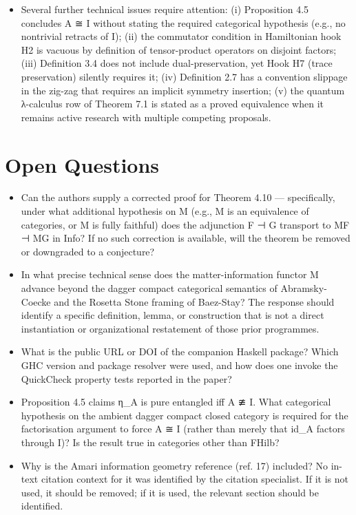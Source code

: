 \documentclass[11pt]{article}
\begin{document}
\begin{itemize}[leftmargin=*]
  \item Several further technical issues require attention: (i) Proposition 4.5 concludes A ≅ I without stating the required categorical hypothesis (e.g., no nontrivial retracts of I); (ii) the commutator condition in Hamiltonian hook H2 is vacuous by definition of tensor-product operators on disjoint factors; (iii) Definition 3.4 does not include dual-preservation, yet Hook H7 (trace preservation) silently requires it; (iv) Definition 2.7 has a convention slippage in the zig-zag that requires an implicit symmetry insertion; (v) the quantum λ-calculus row of Theorem 7.1 is stated as a proved equivalence when it remains active research with multiple competing proposals.
\end{itemize}

\section*{Open Questions}
\begin{itemize}[leftmargin=*]
  \item Can the authors supply a corrected proof for Theorem 4.10 — specifically, under what additional hypothesis on M (e.g., M is an equivalence of categories, or M is fully faithful) does the adjunction F ⊣ G transport to MF ⊣ MG in Info? If no such correction is available, will the theorem be removed or downgraded to a conjecture?
  \item In what precise technical sense does the matter-information functor M advance beyond the dagger compact categorical semantics of Abramsky-Coecke and the Rosetta Stone framing of Baez-Stay? The response should identify a specific definition, lemma, or construction that is not a direct instantiation or organizational restatement of those prior programmes.
  \item What is the public URL or DOI of the companion Haskell package? Which GHC version and package resolver were used, and how does one invoke the QuickCheck property tests reported in the paper?
  \item Proposition 4.5 claims η\_A is pure entangled iff A ≇ I. What categorical hypothesis on the ambient dagger compact closed category is required for the factorisation argument to force A ≅ I (rather than merely that id\_A factors through I)? Is the result true in categories other than FHilb?
  \item Why is the Amari information geometry reference (ref. 17) included? No in-text citation context for it was identified by the citation specialist. If it is not used, it should be removed; if it is used, the relevant section should be identified.
\end{itemize}
\end{document}
